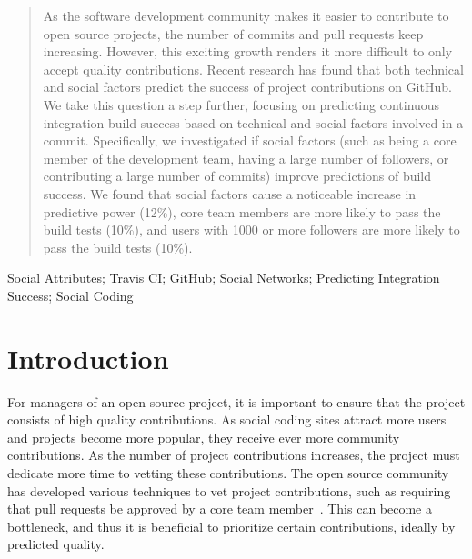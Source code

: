 \documentclass[10pt, conference]{IEEEtran}
\begin{document}




\maketitle


\begin{abstract}
As the software development community makes it easier 
to contribute to open source projects, the number of commits and pull requests 	
keep increasing. However, this exciting growth
renders it more difficult to only accept quality contributions.
Recent research has found 
that both technical and social factors predict
the success of project contributions on GitHub.  
We take this question a step further, focusing on predicting continuous
integration build success based on technical and
social factors involved in a commit.
Specifically, we investigated if social factors (such as being a
core member of the development team, having a large number of followers,
or contributing a large number of commits) improve predictions of build
success.  We found that social factors cause a noticeable increase
in predictive power (12\%), core team members are more likely to pass the build
tests (10\%), and users with 1000 or more followers are more likely to
pass the build tests (10\%).
\end{abstract}

\begin{IEEEkeywords}
Social Attributes; Travis CI; GitHub; Social Networks; Predicting Integration 
Success; Social Coding
\end{IEEEkeywords}


%
\IEEEpeerreviewmaketitle



\section{Introduction}
For managers of an open source project, it is important to ensure that the
project consists of high quality contributions.  As social coding sites attract
more users and projects become more popular, they receive ever more
community contributions.  As the number of project contributions increases,
the project must dedicate more time to vetting these contributions. 
%
The open source
community has developed various techniques to vet project contributions, such as
requiring that pull requests be approved by a core team member~\cite{gousios14}. 
This can become a bottleneck, and thus it is beneficial to prioritize certain
contributions, ideally by predicted quality.
\end{document}
